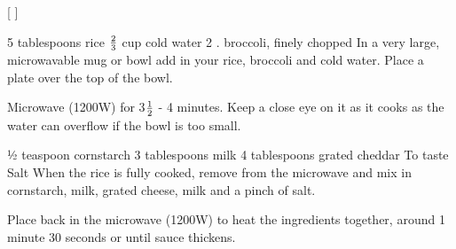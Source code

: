 
[
]

\begin{step}
5 tablespoons rice
$\frac{2}{3}$ cup cold water
2 . broccoli, finely chopped
\method
In a very large, microwavable mug or bowl add in your rice, broccoli and cold water. Place a plate over the top of the bowl.

Microwave (1200W) for 3$\frac{1}{2}$ - 4 minutes. Keep a close eye on it as it cooks as the water can overflow if the bowl is too small.
\end{step}

\begin{step}
½ teaspoon cornstarch
3 tablespoons milk
4 tablespoons grated cheddar
To taste Salt
\method
When the rice is fully cooked, remove from the microwave and mix in cornstarch, milk, grated cheese, milk and a pinch of salt.

Place back in the microwave (1200W) to heat the ingredients together, around 1 minute 30 seconds or until sauce thickens.
\end{step}